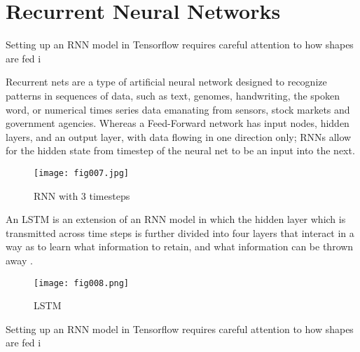 \hfill \break
\hfill \break
\hfill \break
\hfill \break

\section{Recurrent Neural Networks}

Setting up an RNN model in Tensorflow requires careful attention to how shapes are fed i

Recurrent nets are a type of artificial neural network designed to recognize patterns in sequences of data, such as text, genomes, handwriting, the spoken word, or numerical times series data emanating from sensors, stock markets and government agencies. Whereas a Feed-Forward network has input nodes, hidden layers, and an output layer, with data flowing in one direction only; RNNs allow for the hidden state from timestep of the neural net to be an input into the next.

\begin{figure}[h!]
	\centering
	\texttt{[image: fig007.jpg]}
	\caption{RNN with 3 timesteps}
	\label{fig:fig7}
\end{figure} 

An LSTM is an extension of an RNN model in which the hidden layer which is transmitted across time steps is further divided into four layers that interact in a way as to learn what information to retain, and what information can be thrown away \parencite{Olah}. 

\begin{figure}[h!]
	\centering
	\texttt{[image: fig008.png]}
	\caption{LSTM}
	\label{fig:fig8}
\end{figure} 

Setting up an RNN model in Tensorflow requires careful attention to how shapes are fed i